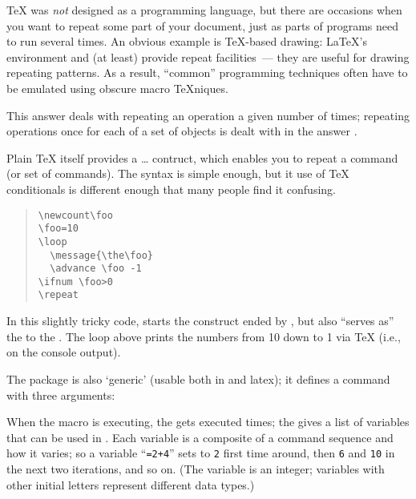 
\TeX{} was \emph{not} designed as a programming language, but there
are occasions when you want to repeat some part of your document, just
as parts of programs need to run several times.  An obvious
example is \TeX{}-based drawing: \LaTeX{}'s 
environment and  (at least) provide repeat facilities~---
they are useful for drawing repeating patterns.  As a result,
``common'' programming techniques often have to be emulated using
obscure macro \TeX{}niques.

This answer deals with repeating an operation a given number of times;
repeating operations once for each of a set of objects is dealt with
in the answer .

Plain \TeX{} itself provides a  \dots{} 
contruct, which enables you to repeat a command (or set of commands).
The syntax is simple enough, but it use of \TeX{} conditionals is
different enough that many people find it confusing.
\begin{quote}
\begin{verbatim}
\newcount\foo
\foo=10
\loop
  \message{\the\foo}
  \advance \foo -1
\ifnum \foo>0
\repeat
\end{verbatim}
\end{quote}
In this slightly tricky code,  starts the construct ended by
, but  also ``serves as'' the  to the
.  The loop above prints the numbers from 10 down to 1 via
\TeX{}  (i.e., on the console output).

The  package is also `generic' (usable both in
\plaintex{} and latex{}); it defines a command  with
three arguments:
\begin{quote}
\end{quote}
When the macro is executing, the  gets executed
 times; the  gives a list of
variables that can be used in .  Each variable is a
composite of a command sequence and how it varies; so a variable
``\texttt{=2+4}'' sets  to \texttt{2} first time
around, then \texttt{6} and \texttt{10} in the next two iterations,
and so on.  (The variable  is an integer; variables with other
initial letters represent different data types.)

